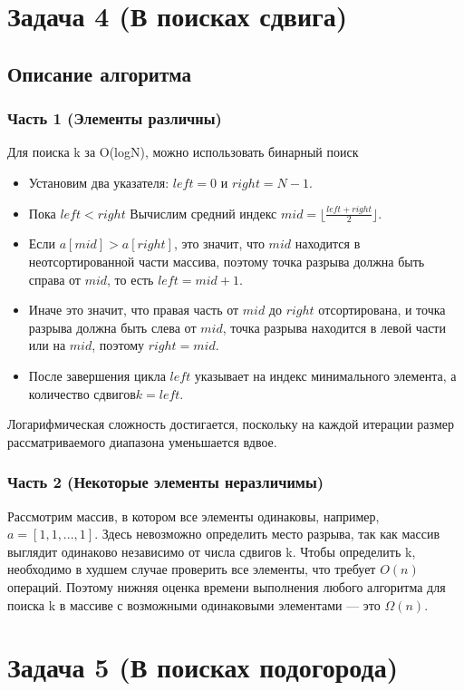 \documentclass[a4paper,14pt]{article}
\begin{document}
\section{Задача 4 (В поисках сдвига)}
\subsection{Описание алгоритма}
\subsubsection{Часть 1 (Элементы различны)}
Для поиска k за O(logN), можно использовать бинарный поиск

\begin{itemize}
    \item Установим два указателя: $left = 0$ и $right = N-1$.
    \item Пока $left < right$ Вычислим средний индекс $mid = \lfloor\frac{left + right}{2}\rfloor$.
    \item Если  $a[mid] > a[right]$, это значит, что $mid$ находится в неотсортированной части массива, поэтому точка разрыва должна быть справа от $mid$, то есть $left = mid+1$.
    \item Иначе это значит, что правая часть от $mid$ до $right$ отсортирована, и точка разрыва должна быть слева от $mid$, точка разрыва находится в левой части или на $mid$, поэтому $right = mid$.
    \item После завершения цикла $left$ указывает на индекс минимального элемента, а количество сдвигов$ k = left$.
\end{itemize}
Логарифмическая сложность достигается, поскольку на каждой итерации размер рассматриваемого диапазона уменьшается вдвое.

\subsubsection{Часть 2 (Некоторые элементы неразличимы)}
Рассмотрим массив, в котором все элементы одинаковы, например, $a = [1,1,... ,1]$. Здесь невозможно определить место разрыва, так как массив выглядит одинаково независимо от числа сдвигов k. Чтобы определить k, необходимо в худшем случае проверить все элементы, что требует $O(n)$ операций.
Поэтому нижняя оценка времени выполнения любого алгоритма для поиска k в массиве с возможными одинаковыми элементами — это $\Omega(n)$.

\section{Задача 5 (В поисках подогорода)}
\end{document}

